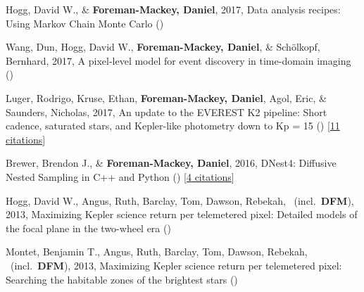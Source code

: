 \item[{\color{numcolor}\scriptsize6}] Hogg, David W., \& \textbf{Foreman-Mackey, Daniel}, 2017, Data analysis recipes: Using Markov Chain Monte Carlo ()

\item[{\color{numcolor}\scriptsize5}] Wang, Dun, Hogg, David W., \textbf{Foreman-Mackey, Daniel}, \& Sch{\"o}lkopf, Bernhard, 2017, A pixel-level model for event discovery in time-domain imaging ()

\item[{\color{numcolor}\scriptsize4}] Luger, Rodrigo, Kruse, Ethan, \textbf{Foreman-Mackey, Daniel}, Agol, Eric, \& Saunders, Nicholas, 2017, An update to the EVEREST K2 pipeline: Short cadence, saturated stars, and Kepler-like photometry down to Kp = 15 () [\href{http://adsabs.harvard.edu/abs/2017arXiv170205488L}{11 citations}]

\item[{\color{numcolor}\scriptsize3}] Brewer, Brendon J., \& \textbf{Foreman-Mackey, Daniel}, 2016, DNest4: Diffusive Nested Sampling in C++ and Python () [\href{http://adsabs.harvard.edu/abs/2016arXiv160603757B}{4 citations}]

\item[{\color{numcolor}\scriptsize2}] Hogg, David W., Angus, Ruth, Barclay, Tom, Dawson, Rebekah, \etal\ (incl.\ \textbf{DFM}), 2013, Maximizing Kepler science return per telemetered pixel: Detailed models of the focal plane in the two-wheel era ()

\item[{\color{numcolor}\scriptsize1}] Montet, Benjamin T., Angus, Ruth, Barclay, Tom, Dawson, Rebekah, \etal\ (incl.\ \textbf{DFM}), 2013, Maximizing Kepler science return per telemetered pixel: Searching the habitable zones of the brightest stars ()
